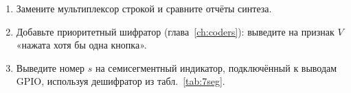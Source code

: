 \begin{taskbox}
\begin{enumerate}
  \item Замените мультиплексор строкой  и сравните
        отчёты синтеза.
  \item Добавьте приоритетный шифратор (глава~\ref{ch:coders}): выведите на
         признак $V$ «нажата хотя бы одна кнопка».
  \item Выведите номер $s$ на семисегментный индикатор, подключённый к
        выводам GPIO, используя дешифратор из табл.~\ref{tab:7seg}.
\end{enumerate}
\end{taskbox}
